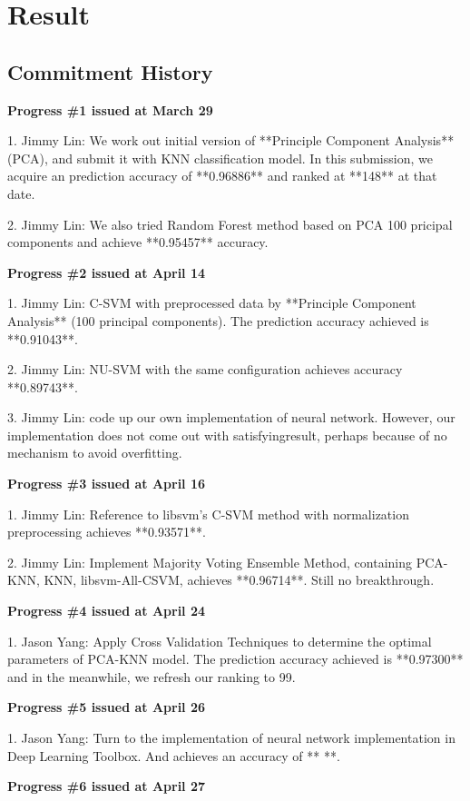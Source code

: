 \documentclass{article} %
\begin{document}
\section{Result} \label{Comparison}

\subsection{Commitment History}
{\bf Progress \#1 issued at March 29 }

1. Jimmy Lin: We work out initial version of **Principle Component Analysis**(PCA), and
submit it with KNN classification model. In this submission, we acquire an
prediction accuracy of **0.96886** and ranked at **148** at that date. 

2. Jimmy Lin: We also tried Random Forest method based on PCA 100 pricipal components and
achieve **0.95457** accuracy.

{\bf Progress \#2 issued at April 14 }

1. Jimmy Lin: C-SVM with preprocessed data by **Principle Component Analysis** (100
principal components). The prediction accuracy achieved is **0.91043**.

2. Jimmy Lin: NU-SVM with the same configuration achieves accuracy **0.89743**.

3. Jimmy Lin: code up our own implementation of neural network. However,
our implementation does not come out with satisfyingresult, perhaps because of
no mechanism to avoid overfitting.  

{\bf Progress \#3 issued at April 16 }

1. Jimmy Lin: Reference to libsvm's C-SVM method with normalization preprocessing achieves **0.93571**.

2. Jimmy Lin: Implement Majority Voting Ensemble Method, containing PCA-KNN, KNN, libsvm-All-CSVM,
achieves **0.96714**. Still no breakthrough.

{\bf Progress \#4 issued at April 24 }

1. Jason Yang: Apply Cross Validation Techniques to determine the optimal parameters of
PCA-KNN model. The prediction accuracy achieved is **0.97300** and in the
meanwhile, we refresh our ranking to 99.


{\bf Progress \#5 issued at April 26 }

1. Jason Yang: Turn to the implementation of neural network implementation in
Deep Learning Toolbox. And achieves an accuracy of ** **.

{\bf Progress \#6 issued at April 27 }
\end{document}
